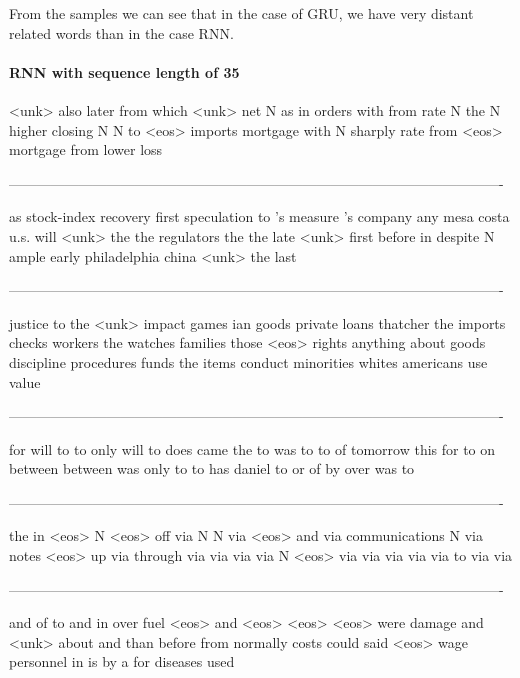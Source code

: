 \begin{enumerate}
\begin{enumerate}
\end{enumerate}

From the samples we can see that in the case of GRU, we have very distant related words than in the case RNN. 



\paragraph{RNN with sequence length of 35}

<unk> also later from which <unk> net N as in orders with from rate N the N higher closing N N to <eos> imports mortgage with N sharply rate from <eos> mortgage from lower loss

----------------------------------------------------------------------------------------------------------

as stock-index recovery first speculation to 's measure 's company any mesa costa u.s. will <unk> the the regulators the the late <unk> first before in despite N ample early philadelphia china <unk> the last

----------------------------------------------------------------------------------------------------------

justice to the <unk> impact games ian goods private loans thatcher the imports checks workers the watches families those <eos> rights anything about goods discipline procedures funds the items conduct minorities whites americans use value

----------------------------------------------------------------------------------------------------------

for will to to only will to does came the to was to to of tomorrow this for to on between between was only to to has daniel to or of by over was to

----------------------------------------------------------------------------------------------------------

the in <eos> N <eos> off via N N via <eos> and via communications N via notes <eos> up via through via via via via N <eos> via via via via via to via via

----------------------------------------------------------------------------------------------------------

and of to and in over fuel <eos> and <eos> <eos> <eos> were damage and <unk> about and than before from normally costs could said <eos> wage personnel in is by a for diseases used


\end{enumerate}
